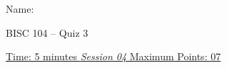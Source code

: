 \documentclass[11pt,paper=a4,answers]{exam}
\begin{document}

\noindent
\begin{minipage}[l]{.5\textwidth}%
\noindent
Name: \underline{\hspace{7cm}}
\end{minipage}
\hfill
\begin{minipage}[r]{0.22\textwidth}%
\begin{center}
{%
\large BISC 104 -- Quiz 3\\[2pt]} %
\end{center}
\end{minipage}
\par
\noindent
\uline{Time: 5 minutes   \hfill \normalsize\emph{\underline{Session 04}} \hfill        Maximum Points: 07}
\end{document}

